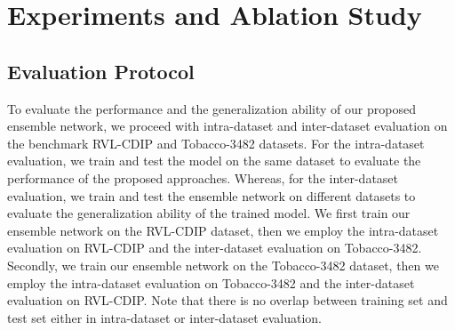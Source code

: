\documentclass[twocolumn]{svjour3}
\begin{document}
\section{Experiments and Ablation Study}
\label{sec:Experiments and Ablation Study}

\subsection{Evaluation Protocol}

To evaluate the performance and the generalization ability of our proposed ensemble network, we proceed with intra-dataset and inter-dataset evaluation on the benchmark RVL-CDIP and Tobacco-3482 datasets. For the intra-dataset evaluation, we train and test the model on the same dataset to evaluate the performance of the proposed approaches. Whereas, for the inter-dataset evaluation, we train and test the ensemble network on different datasets to evaluate the generalization ability of the trained model. We first train our ensemble network on the RVL-CDIP dataset, then we employ the intra-dataset evaluation on RVL-CDIP and the inter-dataset evaluation on Tobacco-3482. Secondly, we train our ensemble network on the Tobacco-3482 dataset, then we employ the intra-dataset evaluation on Tobacco-3482 and the inter-dataset evaluation on RVL-CDIP. Note that there is no overlap between training set and test set either in intra-dataset or inter-dataset evaluation. 
\end{document}
